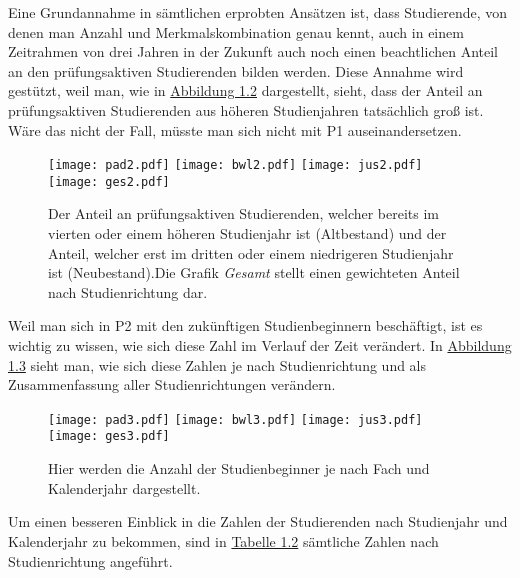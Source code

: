 Eine Grundannahme in s\"amtlichen erprobten Ans\"atzen ist, dass Studierende, von denen man Anzahl und Merkmalskombination genau kennt, auch in einem Zeitrahmen von
drei Jahren in der Zukunft auch noch einen beachtlichen Anteil an den pr\"ufungsaktiven Studierenden bilden werden. Diese Annahme wird gest\"utzt, weil man, wie in \hyperref[fig:abb2]{Abbildung 1.2}
dargestellt, sieht, dass der Anteil an pr\"ufungsaktiven Studierenden aus h\"oheren Studienjahren tats\"achlich gro{\ss} ist. W\"are das nicht der Fall, m\"usste man sich nicht mit
P1 auseinandersetzen.

\begin{figure}[ht]
  \label{fig:abb2}
  \texttt{[image: pad2.pdf]}
  \texttt{[image: bwl2.pdf]}
  \texttt{[image: jus2.pdf]}
  \texttt{[image: ges2.pdf]}
  \caption[Anteile des Neu- und Altbestandes an aktiven Studierenden]{Der Anteil an prüfungsaktiven Studierenden, welcher bereits im vierten oder einem höheren
    Studienjahr ist (Altbestand) und der Anteil, welcher erst im dritten oder einem niedrigeren Studienjahr ist (Neubestand).Die Grafik \textit{Gesamt} stellt einen gewichteten
    Anteil nach Studienrichtung dar.}
\end{figure}

Weil man sich in P2 mit den zuk\"unftigen Studienbeginnern besch\"aftigt, ist es wichtig zu wissen, wie sich diese Zahl im Verlauf der Zeit ver\"andert. In
\hyperref[fig:abb3]{Abbildung 1.3} sieht man, wie sich diese Zahlen je nach Studienrichtung und als Zusammenfassung aller Studienrichtungen ver\"andern.

\begin{figure}[ht]
  \label{fig:abb3}
  \texttt{[image: pad3.pdf]}
  \texttt{[image: bwl3.pdf]}
  \texttt{[image: jus3.pdf]}
  \texttt{[image: ges3.pdf]}
  \caption[Anzahl der Studienbeginner nach Fach und Kalenderjahr]{Hier werden die Anzahl der Studienbeginner je nach Fach und Kalenderjahr dargestellt.}
\end{figure}

Um einen besseren Einblick in die Zahlen der Studierenden nach Studienjahr und Kalenderjahr zu bekommen, sind in \hyperref[tab:numbers]{Tabelle 1.2} s\"amtliche
Zahlen nach Studienrichtung angef\"uhrt.

